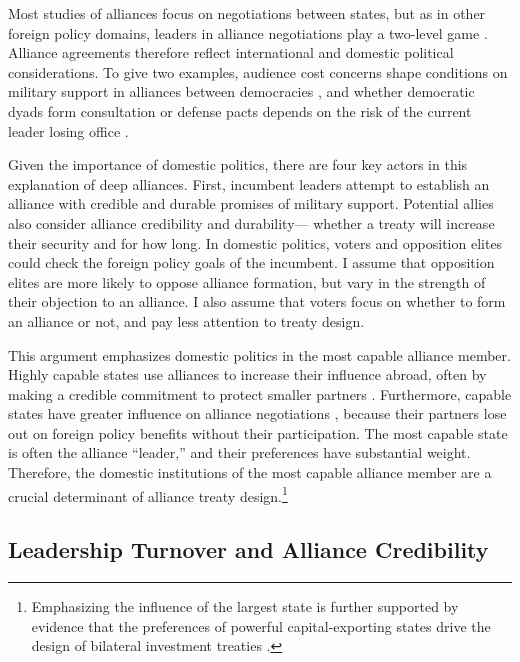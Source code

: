 \documentclass[12pt]{article}
\begin{document}
Most studies of alliances focus on negotiations between states, but as in other foreign policy domains, leaders in alliance negotiations play a two-level game \citep{Putnam1988}. 
Alliance agreements therefore reflect international and domestic political considerations. 
To give two examples, audience cost concerns shape conditions on military support in alliances between democracies \citep{Chibaetal2015, FjelstulReiter2019}, and whether democratic dyads form consultation or defense pacts depends on the risk of the current leader losing office \citep{Mattes2012a}. 


Given the importance of domestic politics, there are four key actors in this explanation of deep alliances. 
First, incumbent leaders attempt to establish an alliance with credible and durable promises of military support. 
Potential allies also consider alliance credibility and durability--- whether a treaty will increase their security and for how long. 
In domestic politics, voters and opposition elites could check the foreign policy goals of the incumbent. 
I assume that opposition elites are more likely to oppose alliance formation, but vary in the strength of their objection to an alliance. 
I also assume that voters focus on whether to form an alliance or not, and pay less attention to treaty design.


This argument emphasizes domestic politics in the most capable alliance member. 
Highly capable states use alliances to increase their influence abroad, often by making a credible commitment to protect smaller partners \citep{Morrow1994}. 
Furthermore, capable states have greater influence on alliance negotiations \citep{Mattes2012}, because their partners lose out on foreign policy benefits without their participation.
The most capable state is often the alliance ``leader,'' and their preferences have substantial weight. 
Therefore, the domestic institutions of the most capable alliance member are a crucial determinant of alliance treaty design.\footnote{Emphasizing the influence of the largest state is further supported by evidence that the preferences of powerful capital-exporting states drive the design of bilateral investment treaties \citep{AlleePeinhardt2014}.} 


\subsection{Leadership Turnover and Alliance Credibility}
\end{document}
